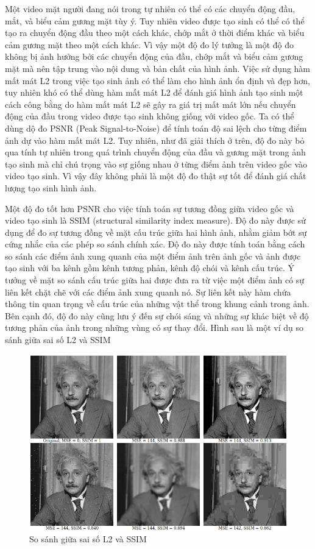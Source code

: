 Một video mặt người đang nói trong tự nhiên có thể có các chuyển động đầu, mắt, và biểu cảm gương mặt tùy ý. Tuy nhiên video được tạo sinh có thể có thể tạo ra chuyển động đầu theo một cách khác, chớp mắt ở thời điểm khác và biểu cảm gương mặt theo một cách khác. Vì vậy một độ đo lý tưởng là một độ đo không bị ảnh hưởng bởi các chuyển động của đầu, chớp mắt và biểu cảm gương mặt mà nên tập trung vào nội dung và bản chất của hình ảnh. Việc sử dụng hàm mất mát L2 trong việc tạo sinh ảnh có thể làm cho hình ảnh ổn định và đẹp hơn, tuy nhiên khó có thể dùng hàm mất mát L2 để đánh giá hình ảnh tạo sinh một cách công bằng do hàm mất mát L2 sẽ gây ra giá trị mất mát lớn nếu chuyển động của đầu trong video được tạo sinh không giống với video gốc. Ta có thể dùng dộ đo PSNR (Peak Signal-to-Noise) để tính toán độ sai lệch cho từng điểm ảnh dự vào hàm mất mát L2. Tuy nhiên, như đã giải thích ở trên, độ đo này bỏ qua tính tự nhiên trong quá trình chuyển động của đầu và gương mặt trong ảnh tạo sinh mà chỉ chú trọng vào sự giống nhau ở từng điểm ảnh trên video gốc vào video tạo sinh. Vì vậy đây không phải là một độ đo thật sự tốt để đánh giá chất lượng tạo sinh hình ảnh.

Một độ đo tốt hơn PSNR cho việc tính toán sự tương đồng giữa video gốc và video tạo sinh là SSIM (structural similarity index measure). Độ đo này được sử dụng để đo sự tương đồng về mặt cấu trúc giữa hai hình ảnh, nhằm giảm bớt sự cứng nhắc của các phép so sánh chính xác. Độ đo này được tính toán bằng cách so sánh các điểm ảnh xung quanh của một điểm ảnh trên ảnh gốc và ảnh được tạo sinh với ba kênh gồm kênh tương phản, kênh độ chói và kênh cấu trúc. Ý tưởng về mặt so sánh cấu trúc giữa hai được đưa ra từ việc một điểm ảnh có sự liên kết chặt chẽ với các điểm ảnh xung quanh nó. Sự liên kết này hàm chứa thông tin quan trọng về cấu trúc của những vật thể trong khung cảnh trong ảnh. Bên cạnh đó, độ đo này cũng lưu ý đến sự chói sáng và những sự khác biệt về độ tương phản của ảnh trong những vùng có sự thay đổi. Hình sau là một ví dụ so sánh giữa sai số L2 và SSIM

\begin{figure}[H]
    \centering
    \includegraphics[width=15cm]{./content/materials/l2_ssim.png}
    \caption{So sánh giữa sai số L2 và SSIM}
\end{figure}

